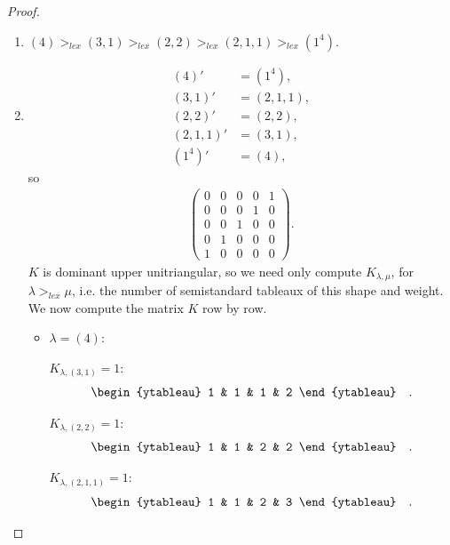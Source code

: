 \documentclass[12pt]{extarticle}
\newcommand{\<}{\langle}
\renewcommand{\>}{\rangle}
\theoremstyle{definition}
\begin{document}
\begin{proof}
  \begin{enumerate}
  \item
    $(4) >_{lex} (3,1) >_{lex} (2,2) >_{lex} (2,1,1) >_{lex} (1^4)$.
  \item
    \begin{align*}
      (4)' &= (1^4), \\
      (3,1)' &= (2,1,1), \\
      (2,2)'&=(2,2), \\
      (2,1,1)'&=(3,1), \\
      (1^4)'&=(4) ,
    \end{align*}
    so
    \begin{align*}
      \begin{pmatrix}
        0 & 0 & 0 & 0 & 1 \\
        0 & 0 & 0 & 1 & 0 \\
        0 & 0 & 1 & 0 & 0 \\
        0 & 1 & 0 & 0 & 0 \\
        1 & 0 & 0 & 0 & 0
      \end{pmatrix}.
    \end{align*}
    $K$ is dominant upper unitriangular, so we need only compute $K_{\lambda,\mu}$, for $\lambda>_{lex} \mu$, i.e. the number of semistandard tableaux of this shape and weight. We now compute the matrix $K$ row by row.
    \begin{itemize}
    \item
      $\lambda = (4)$:

      $K_{\lambda, (3,1)} = 1$:
      \begin{align*}
        \begin{ytableau}
          1 & 1 & 1 & 2 
        \end{ytableau}\quad.
      \end{align*}

      $K_{\lambda, (2,2)} = 1$:
      \begin{align*}
        \begin{ytableau}
          1 & 1 & 2 & 2 
        \end{ytableau}\quad.
      \end{align*}

      $K_{\lambda, (2,1,1)} = 1$:
      \begin{align*}
        \begin{ytableau}
          1 & 1 & 2 & 3 
        \end{ytableau}\quad.
      \end{align*}


\end{itemize}
\end{enumerate}
\end{proof}
\end{document}
